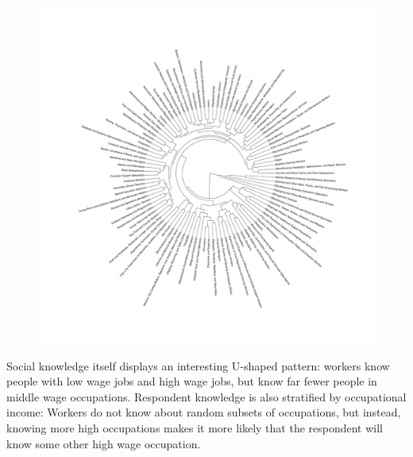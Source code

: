 

%   
%  



\begin{figure}
\begin{minipage}{0.90 \linewidth}
\includegraphics[width = \linewidth]{./plots/dendrogram.pdf}
\end{minipage}  
\end{figure} 


Social knowledge itself displays an interesting U-shaped pattern: 
workers know people with low wage jobs and high wage jobs, but know far fewer people in middle wage occupations. 
Respondent knowledge is also stratified by occupational income: 
Workers do not know about random subsets of occupations, but instead, knowing more high occupations makes it more likely that the respondent will know some other high wage occupation. 


